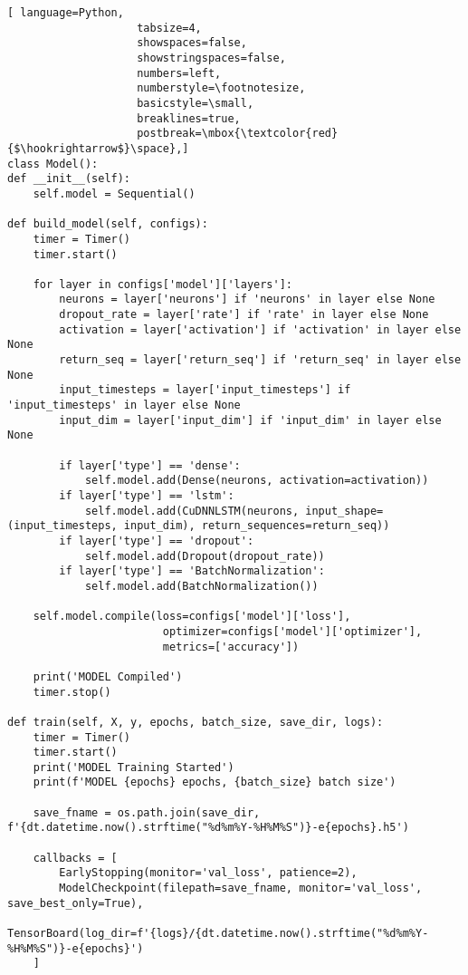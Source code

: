 \label{chap:appendix}
{
\begin{lstlisting}[ language=Python,
                    tabsize=4,
                    showspaces=false,
                    showstringspaces=false,
                    numbers=left,
                    numberstyle=\footnotesize,
                    basicstyle=\small,
                    breaklines=true,
                    postbreak=\mbox{\textcolor{red}{$\hookrightarrow$}\space},]
class Model():
def __init__(self):
    self.model = Sequential()

def build_model(self, configs):
    timer = Timer()
    timer.start()

    for layer in configs['model']['layers']:
        neurons = layer['neurons'] if 'neurons' in layer else None
        dropout_rate = layer['rate'] if 'rate' in layer else None
        activation = layer['activation'] if 'activation' in layer else None
        return_seq = layer['return_seq'] if 'return_seq' in layer else None
        input_timesteps = layer['input_timesteps'] if 'input_timesteps' in layer else None
        input_dim = layer['input_dim'] if 'input_dim' in layer else None
        
        if layer['type'] == 'dense':
            self.model.add(Dense(neurons, activation=activation))
        if layer['type'] == 'lstm':
            self.model.add(CuDNNLSTM(neurons, input_shape=(input_timesteps, input_dim), return_sequences=return_seq))
        if layer['type'] == 'dropout':
            self.model.add(Dropout(dropout_rate))
        if layer['type'] == 'BatchNormalization':
            self.model.add(BatchNormalization())
            
    self.model.compile(loss=configs['model']['loss'], 
                        optimizer=configs['model']['optimizer'],
                        metrics=['accuracy'])

    print('MODEL Compiled')
    timer.stop()   

def train(self, X, y, epochs, batch_size, save_dir, logs):
    timer = Timer() 
    timer.start()
    print('MODEL Training Started')
    print(f'MODEL {epochs} epochs, {batch_size} batch size')

    save_fname = os.path.join(save_dir, f'{dt.datetime.now().strftime("%d%m%Y-%H%M%S")}-e{epochs}.h5')

    callbacks = [
        EarlyStopping(monitor='val_loss', patience=2),
        ModelCheckpoint(filepath=save_fname, monitor='val_loss', save_best_only=True),
        TensorBoard(log_dir=f'{logs}/{dt.datetime.now().strftime("%d%m%Y-%H%M%S")}-e{epochs}')
    ]  


\end{lstlisting}}
